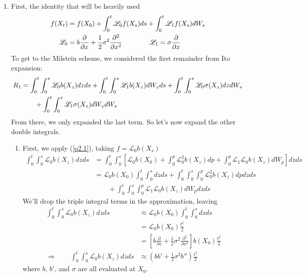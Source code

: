 \documentclass[12pt]{article}
\theoremstyle{plain}
\theoremstyle{definition}
\theoremstyle{remark}
\begin{document}
\begin{enumerate}
  \clearpage
  \item %
    First, the identity that will be heavily used
    \begin{align}
      f(X_t) &= f(X_0) + \int^t_0 \mathscr{L}_0 f(X_s) ds
      +\int^t_0 \mathscr{L}_1 f(X_s) dW_s
      \label{q2.1}\\
      \mathscr{L}_0
        &= b\frac{\partial}{\partial x}
          +\frac{1}{2}\sigma^2\frac{\partial^2}{\partial x^2}
        \qquad\qquad
      \mathscr{L}_1 = \sigma \frac{\partial}{\partial x}
      \notag
    \end{align}
    To get to the Milstein scheme, we considered the first remainder
    from Ito expansion:
    \begin{align}
      \label{q2.2}
      R_1
      &=
      \int^t_0 \int^s_0 \mathscr{L}_0b(X_z) dz ds
      +\int^t_0 \int^s_0 \mathscr{L}_1 b(X_z) dW_z ds
      +\int^t_0 \int^s_0 \mathscr{L}_0 \sigma(X_z) dz dW_s\\
      &\qquad
      +\int^t_0 \int^s_0 \mathscr{L}_1 \sigma(X_z) dW_z dW_s
      \notag
    \end{align}
    From there, we only expanded the last term.  So let's now expand the
    other double integrals.
    \begin{enumerate}
      \item First, we apply (\ref{q2.1}), taking $f=\mathscr{L}_0b(X_s)$
        \begin{align*}
          \int^t_0 \int^s_0 \mathscr{L}_0b(X_z) dz ds
          &=
          \int^t_0 \int^s_0 \left[
            \mathscr{L}_0b(X_0)
            + \int^p_0 \mathscr{L}_0^2b(X_z) dp
            + \int^p_0 \mathscr{L}_1\mathscr{L}_0b(X_z) dW_p
            \right] dz ds \\
          &=
          \mathscr{L}_0b(X_0)
            \int^t_0 \int^s_0 dz ds
            + \int^t_0 \int^s_0\int^p_0 \mathscr{L}_0^2b(X_z) dp dz ds\\
          &\qquad
            + \int^t_0 \int^s_0\int^p_0
              \mathscr{L}_1\mathscr{L}_0b(X_z) dW_p dz ds
        \end{align*}
        We'll drop the triple integral terms in the approximation,
        leaving
        \begin{align*}
          \int^t_0 \int^s_0 \mathscr{L}_0b(X_z) dz ds
          &\approx
          \mathscr{L}_0b(X_0) \int^t_0 \int^s_0 dz ds\\
          &=
          \mathscr{L}_0b(X_0) \frac{t^2}{2}\\
          &=
          \left[ b\frac{\partial}{\partial x} + \frac{1}{2}\sigma^2
          \frac{\partial^2}{\partial x^2}\right]
            b(X_0) \frac{t^2}{2}\\
          \Rightarrow \qquad
          \int^t_0 \int^s_0 \mathscr{L}_0b(X_z) dz ds
            &\approx \left( bb' + \frac{1}{2}\sigma^2 b''\right)
            \frac{t^2}{2}
        \end{align*}
        where $b$, $b'$, and $\sigma$ are all evaluated at $X_0$.


\end{enumerate}
\end{enumerate}
\end{document}
